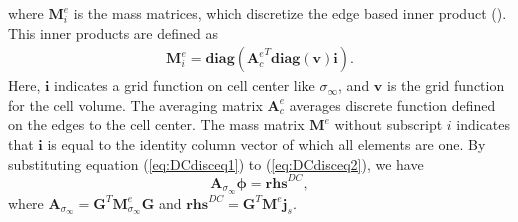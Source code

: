 \documentclass[a4paper, 11pt]{article}
\newcommand{\siginf}{\sigma_\infty}
\newcommand{\dgrad}{{\mathbf G}}
\newcommand{\Ace}{{\mathbf A_c^e}}
\newcommand{\diag}{\mathbf{diag}}
\newcommand{\M}{{\mathbf M}}
\newcommand{\MeSigInf}{{\M^e_{\sigma_\infty}}}
\newcommand{\Me}{{\M^e}}
\renewcommand {\dj}  { {\mathbf{j} } }
\newcommand{\vol}{\mathbf{v}}
\newcommand{\A}{\mathbf{A}}
\begin{document}
where $\mathbf{M}^e_i$ is the mass matrices, which discretize the edge based inner product (\cite{Eldadbook}). This inner products are defined  as
\begin{align}
  \mathbf{M}^e_i = \diag(\Ace^T\diag(\vol)\mathbf{i}).
\end{align}
Here, $\mathbf{i}$ indicates a grid function on cell center like $\siginf$, and $\vol$ is the grid function for the cell volume. The averaging matrix $\Ace$ averages discrete function defined on the edges to the cell center. The mass matrix $\Me$ without subscript $i$ indicates that $\mathbf{i}$ is equal to the identity column vector of which all elements are one. By substituting equation (\ref{eq:DCdisceq1}) to (\ref{eq:DCdisceq2}), we have
\begin{equation}
  \A_{\siginf}\boldsymbol{\phi} = \mathbf{rhs}^{DC},
  \label{eq:DCdiscLin}
\end{equation}
where $\A_{\siginf} = \dgrad^T \MeSigInf\dgrad$ and $\mathbf{rhs}^{DC} = \dgrad^T \Me\dj_s$. 

\end{document}
